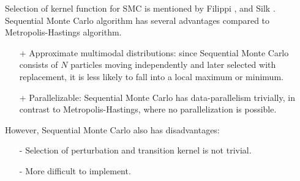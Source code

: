\noindent Selection of kernel function for SMC is mentioned by Filippi \cite{filippi2013optimality},
and Silk \cite{silk2012optimizing}. Sequential Monte Carlo algorithm has several advantages compared
to Metropolis-Hastings algorithm.
\begin{itemize}
    \item[+] Approximate multimodal distributions: since Sequential Monte Carlo consists of $N$
          particles moving independently and later selected with replacement, it is less likely to
          fall into a local maximum or minimum.
    \item[+] Parallelizable: Sequential Monte Carlo has data-parallelism trivially, in contrast to
          Metropolis-Hastings, where no parallelization is possible.
\end{itemize}
However, Sequential Monte Carlo also has disadvantages:
\begin{itemize}
    \item[-] Selection of perturbation and transition kernel is not trivial.
    \item[-] More difficult to implement.
\end{itemize}


